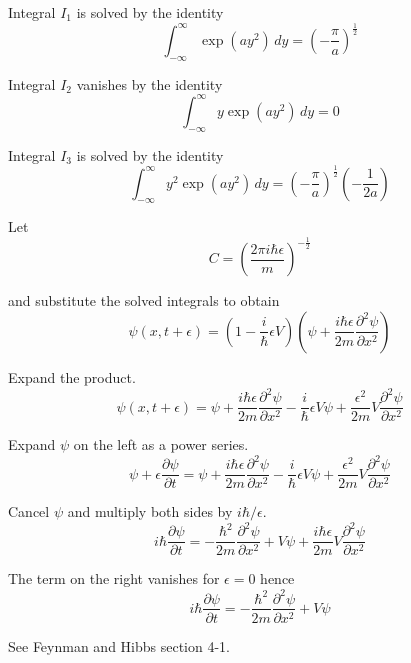 Integral $I_1$ is solved by the identity
\begin{equation*}
\int_{-\infty}^\infty\exp(ay^2)\,dy=\left(-\frac{\pi}{a}\right)^\frac{1}{2}
\end{equation*}

Integral $I_2$ vanishes by the identity
\begin{equation*}
\int_{-\infty}^\infty y\exp(ay^2)\,dy=0
\end{equation*}

Integral $I_3$ is solved by the identity
\begin{equation*}
\int_{-\infty}^\infty y^2\exp(ay^2)\,dy=\left(-\frac{\pi}{a}\right)^\frac{1}{2}\left(-\frac{1}{2a}\right)
\end{equation*}

Let
\begin{equation*}
C=\left(\frac{2\pi i\hbar\epsilon}{m}\right)^{-\frac{1}{2}}
\end{equation*}

and substitute the solved integrals to obtain
\begin{equation*}
\psi(x,t+\epsilon)=\left(1-\frac{i}{\hbar}\epsilon V\right)
\left(\psi+\frac{i\hbar\epsilon}{2m}\frac{\partial^2\psi}{\partial x^2}\right)
\end{equation*}

Expand the product.
\begin{equation*}
\psi(x,t+\epsilon)=\psi
+\frac{i\hbar\epsilon}{2m}\frac{\partial^2\psi}{\partial x^2}
-\frac{i}{\hbar}\epsilon V\psi
+\frac{\epsilon^2}{2m}V\frac{\partial^2\psi}{\partial x^2}
\end{equation*}

Expand $\psi$ on the left as a power series.
\begin{equation*}
\psi+\epsilon\frac{\partial\psi}{\partial t}
=\psi
+\frac{i\hbar\epsilon}{2m}\frac{\partial^2\psi}{\partial x^2}
-\frac{i}{\hbar}\epsilon V\psi
+\frac{\epsilon^2}{2m}V\frac{\partial^2\psi}{\partial x^2}
\end{equation*}

Cancel $\psi$ and multiply both sides by $i\hbar/\epsilon$.
\begin{equation*}
i\hbar\frac{\partial\psi}{\partial t}
=-\frac{\hbar^2}{2m}\frac{\partial^2\psi}{\partial x^2}+V\psi
+\frac{i\hbar\epsilon}{2m}V\frac{\partial^2\psi}{\partial x^2}
\end{equation*}

The term on the right vanishes for $\epsilon=0$ hence
\begin{equation*}
i\hbar\frac{\partial\psi}{\partial t}
=-\frac{\hbar^2}{2m}\frac{\partial^2\psi}{\partial x^2}+V\psi
\end{equation*}

See Feynman and Hibbs section 4-1.


